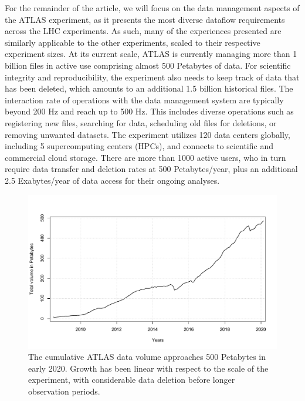 \documentclass[11pt]{article}
\begin{document}
For the remainder of the article, we will focus on the data management aspects of the ATLAS experiment, as it presents the most diverse dataflow requirements across the LHC experiments. As such, many of the experiences presented are similarly applicable to the other experiments, scaled to their respective experiment sizes. At its current scale, ATLAS is currently managing more than 1 billion files in active use comprising almost 500 Petabytes of data. For scientific integrity and reproducibility, the experiment also needs to keep track of data that has been deleted, which amounts to an additional 1.5 billion historical files. The interaction rate of operations with the data management system are typically beyond 200 Hz and reach up to 500 Hz. This includes diverse operations such as registering new files, searching for data, scheduling old files for deletions, or removing unwanted datasets. The experiment utilizes 120 data centers globally, including 5 supercomputing centers (HPCs), and connects to scientific and commercial cloud storage. There are more than 1000 active users, who in turn require data transfer and deletion rates at 500 Petabytes/year, plus an additional 2.5 Exabytes/year of data access for their ongoing analyses.

\begin{figure}[t]
        \centering
        \includegraphics[width=\textwidth]{figs/data_evolution.pdf}
        \caption{The cumulative ATLAS data volume approaches 500 Petabytes in early 2020. Growth has been linear with respect to the scale of the experiment, with considerable data deletion before longer observation periods.}
        \label{fig:atlas_volume}
\end{figure}
\end{document}
